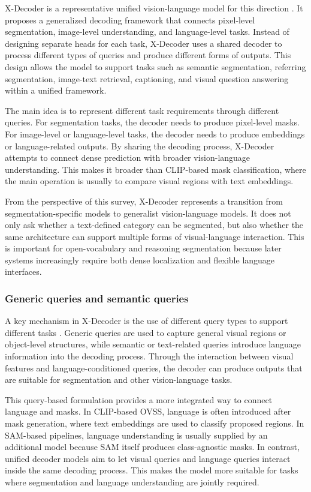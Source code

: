 X-Decoder is a representative unified vision-language model for this direction \cite{Zou2023}. 
It proposes a generalized decoding framework that connects pixel-level segmentation, image-level understanding, and language-level tasks. 
Instead of designing separate heads for each task, X-Decoder uses a shared decoder to process different types of queries and produce different forms of outputs. 
This design allows the model to support tasks such as semantic segmentation, referring segmentation, image-text retrieval, captioning, and visual question answering within a unified framework.

The main idea is to represent different task requirements through different queries. 
For segmentation tasks, the decoder needs to produce pixel-level masks. 
For image-level or language-level tasks, the decoder needs to produce embeddings or language-related outputs. 
By sharing the decoding process, X-Decoder attempts to connect dense prediction with broader vision-language understanding. 
This makes it broader than CLIP-based mask classification, where the main operation is usually to compare visual regions with text embeddings.

From the perspective of this survey, X-Decoder represents a transition from segmentation-specific models to generalist vision-language models. 
It does not only ask whether a text-defined category can be segmented, but also whether the same architecture can support multiple forms of visual-language interaction. 
This is important for open-vocabulary and reasoning segmentation because later systems increasingly require both dense localization and flexible language interfaces.

\subsubsection{Generic queries and semantic queries}

A key mechanism in X-Decoder is the use of different query types to support different tasks \cite{zou2023xdecoder}. 
Generic queries are used to capture general visual regions or object-level structures, while semantic or text-related queries introduce language information into the decoding process. 
Through the interaction between visual features and language-conditioned queries, the decoder can produce outputs that are suitable for segmentation and other vision-language tasks.

This query-based formulation provides a more integrated way to connect language and masks. 
In CLIP-based OVSS, language is often introduced after mask generation, where text embeddings are used to classify proposed regions. 
In SAM-based pipelines, language understanding is usually supplied by an additional model because SAM itself produces class-agnostic masks. 
In contrast, unified decoder models aim to let visual queries and language queries interact inside the same decoding process. 
This makes the model more suitable for tasks where segmentation and language understanding are jointly required.

